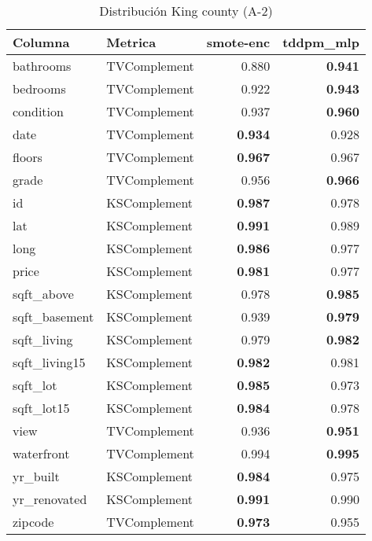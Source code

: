 \begin{table}[H]
\centering
\caption{Distribución King county (A-2)}
\label{table-shape-king county-a-2}
\begin{tabular}{|l|l|r|r|}
\hline
\rowcolor[gray]{0.8}
Columna & Metrica & smote-enc & tddpm\_mlp \\
\hline bathrooms & TVComplement & 0.880 & \bfseries 0.941 \\
\hline bedrooms & TVComplement & 0.922 & \bfseries 0.943 \\
\hline condition & TVComplement & 0.937 & \bfseries 0.960 \\
\hline date & TVComplement & \bfseries 0.934 & 0.928 \\
\hline floors & TVComplement & \bfseries 0.967 & 0.967 \\
\hline grade & TVComplement & 0.956 & \bfseries 0.966 \\
\hline id & KSComplement & \bfseries 0.987 & 0.978 \\
\hline lat & KSComplement & \bfseries 0.991 & 0.989 \\
\hline long & KSComplement & \bfseries 0.986 & 0.977 \\
\hline price & KSComplement & \bfseries 0.981 & 0.977 \\
\hline sqft\_above & KSComplement & 0.978 & \bfseries 0.985 \\
\hline sqft\_basement & KSComplement & 0.939 & \bfseries 0.979 \\
\hline sqft\_living & KSComplement & 0.979 & \bfseries 0.982 \\
\hline sqft\_living15 & KSComplement & \bfseries 0.982 & 0.981 \\
\hline sqft\_lot & KSComplement & \bfseries 0.985 & 0.973 \\
\hline sqft\_lot15 & KSComplement & \bfseries 0.984 & 0.978 \\
\hline view & TVComplement & 0.936 & \bfseries 0.951 \\
\hline waterfront & TVComplement & 0.994 & \bfseries 0.995 \\
\hline yr\_built & KSComplement & \bfseries 0.984 & 0.975 \\
\hline yr\_renovated & KSComplement & \bfseries 0.991 & 0.990 \\
\hline zipcode & TVComplement & \bfseries 0.973 & 0.955 \\
\hline
\end{tabular}
\end{table}
